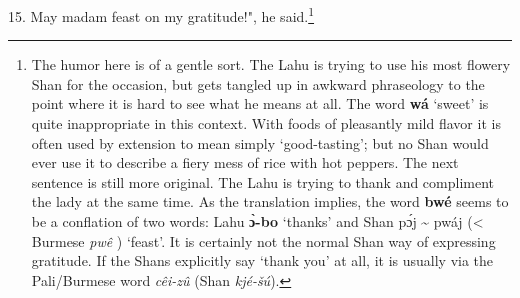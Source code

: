 15. May madam feast on my gratitude!", he said.\footnote{The humor here is of a gentle sort. The Lahu is trying to use his most flowery Shan for the occasion, but gets tangled up in awkward phraseology to the point where it is hard to see what he means at all. The word \textbf{wá} `sweet' is quite inappropriate in this context. With foods of pleasantly mild flavor it is often used by extension to mean simply `good-tasting'; but no Shan would ever use it to describe a fiery mess of rice with hot peppers. The next sentence is still more original. The Lahu is trying to thank and compliment the lady at the same time. As the translation implies, the word \textbf{bwé} seems to be a conflation of two words: Lahu \textbf{ɔ̀-bo} `thanks' and Shan pɔ́j \textasciitilde{} pwáj (< Burmese \textit{pwê} ) `feast'. It is certainly not the normal Shan way of expressing gratitude. If the Shans explicitly say `thank you' at all, it is usually via the Pali/Burmese word \textit{cêi-zû} (Shan \textit{kjé-šú}).}


